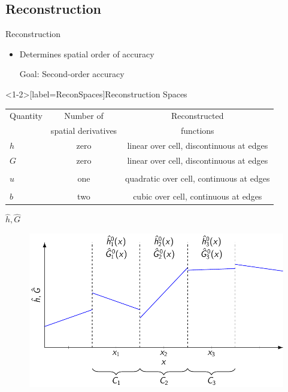 \documentclass[pdf]{beamer}
\begin{document}
\subsection{Reconstruction}
\begin{frame}{Reconstruction}
	\begin{itemize}
		\item Determines spatial order of accuracy \\ \pause 
		\item[Goal:] Second-order accuracy %
	\end{itemize}
\end{frame}
\begin{frame}<1-2>[label=ReconSpaces]{Reconstruction Spaces}
	\begin{tabular}{l | c | c}
		Quantity& Number of &  Reconstructed \\
		 & spatial derivatives &  functions\\
		\hline \pause
		$h$ & zero & linear over cell, discontinuous at edges \\
		$G$ & zero & linear over cell, discontinuous at edges  \\ & & \\
		\pause 
		$u$ & one & quadratic over cell, continuous at edges\\ & & \\
		\pause
		$b$ & two & cubic over cell, continuous at edges \\ 
	\end{tabular}
\end{frame}
\begin{frame}{$\hat{h},\hat{G}$}
	\begin{figure}
		\includegraphics[width=\textwidth]{./Pics/Tex/Reconstructions/P1.pdf}
	\end{figure}
\end{frame}
\end{document}
